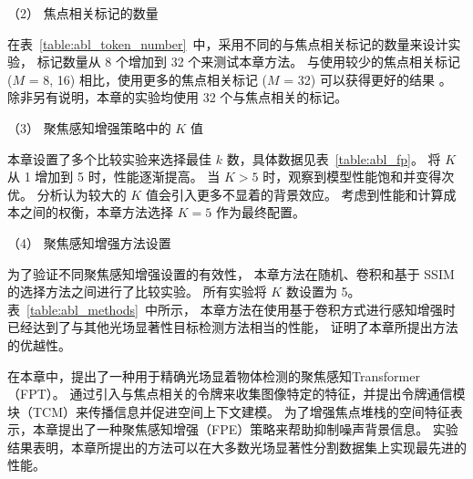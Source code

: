  



（2）
焦点相关标记的数量



在表~\ref{table:abl_token_number}~中，采用不同的与焦点相关标记的数量来设计实验，
标记数量从 8 个增加到 32 个来测试本章方法。
与使用较少的焦点相关标记 ($M$ = 8, 16) 相比，使用更多的焦点相关标记 ($M$ = 32) 可以获得更好的结果 。 
除非另有说明，本章的实验均使用 32 个与焦点相关的标记。 







（3）
聚焦感知增强策略中的 $K$ 值


本章设置了多个比较实验来选择最佳 $k$ 数，具体数据见表~\ref{table:abl_fp}。
将 $K$ 从 1 增加到 5 时，性能逐渐提高。 
当 $K > 5$ 时，观察到模型性能饱和并变得次优。 
分析认为较大的 $K$ 值会引入更多不显着的背景效应。 
考虑到性能和计算成本之间的权衡，本章方法选择 $K = 5$ 作为最终配置。


（4）
聚焦感知增强方法设置



为了验证不同聚焦感知增强设置的有效性，
本章方法在随机、卷积和基于 SSIM 的选择方法之间进行了比较实验。 
所有实验将 $K$ 数设置为 5。
表~\ref{table:abl_methods}~中所示，
本章方法在使用基于卷积方式进行感知增强时已经达到了与其他光场显著性目标检测方法相当的性能，
证明了本章所提出方法的优越性。




在本章中，提出了一种用于精确光场显着物体检测的聚焦感知Transformer（FPT）。 
通过引入与焦点相关的令牌来收集图像特定的特征，并提出令牌通信模块（TCM）来传播信息并促进空间上下文建模。 
为了增强焦点堆栈的空间特征表示，本章提出了一种聚焦感知增强（FPE）策略来帮助抑制噪声背景信息。 
实验结果表明，本章所提出的方法可以在大多数光场显著性分割数据集上实现最先进的性能。